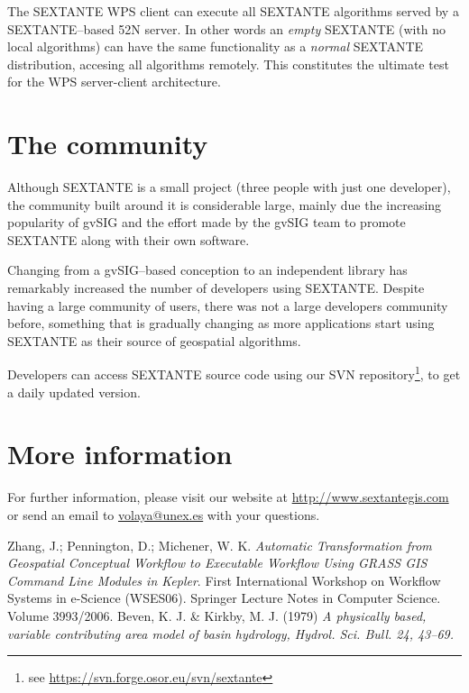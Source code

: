 \documentclass[12pt,a4paper,twocolumn]{article}
\begin{document}
The SEXTANTE WPS client can execute all SEXTANTE algorithms served by a SEXTANTE--based 52N server. In other words an \emph{empty} SEXTANTE (with no local algorithms) can have the same functionality as a \emph{normal} SEXTANTE distribution, accesing all algorithms remotely. This constitutes the ultimate test for the WPS server-client architecture.


\section{The community}

Although SEXTANTE is a small project (three people with just one developer), the community built around it is considerable large, mainly due the increasing popularity of gvSIG and the effort made by the gvSIG team to promote SEXTANTE along with their own software.

Changing from a gvSIG--based conception to an independent library has remarkably increased the number of developers using SEXTANTE. Despite having a large community of users, there was not a large developers community before, something that is gradually changing as more applications start using SEXTANTE as their source of geospatial algorithms.

Developers can access SEXTANTE source code using our SVN repository\footnote{see \url{https://svn.forge.osor.eu/svn/sextante}}, to get a daily updated version. 


\section{More information}

For further information, please visit our website at \url{http://www.sextantegis.com} or send an email to \url{volaya@unex.es} with your questions.

\begin{thebibliography}{2}
Zhang, J.; Pennington, D.; Michener, W. K. \emph{Automatic Transformation from Geospatial Conceptual Workflow to Executable Workflow Using GRASS GIS Command Line Modules in Kepler}. First International Workshop on Workflow Systems in e-Science (WSES06). Springer Lecture Notes in Computer Science. Volume 3993/2006. 
 Beven, K. J. \& Kirkby, M. J. (1979) \it{A physically based, variable contributing area model of basin hydrology}, Hydrol. Sci. Bull. 24, 43--69.
\end{thebibliography}
\end{document}
